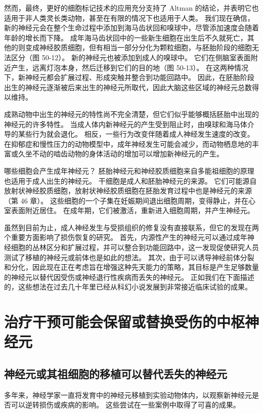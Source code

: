 然而，最终，更好的细胞标记技术的应用充分支持了 Altman 的结论，并表明它也适用于非人类灵长类动物，甚至在有限的情况下也适用于人类。 我们现在确信，新的神经元会在整个生命过程中添加到海马齿状回和嗅球中，尽管添加速度会随着年龄的增长而下降。 成年海马齿状回中的一些新生细胞在出生后不久就死亡，其他的则变成神经胶质细胞，但有相当一部分分化为颗粒细胞，与胚胎阶段的细胞无法区分（图 50-12）。 新的神经元也被添加到成人的嗅球中。 它们在侧脑室表面附近产生，远离灯泡本身，然后迁移到它们的目的地（图 50-13）。 在这两种情况下，新神经元都会扩展过程、形成突触并整合到功能回路中。 因此，在胚胎阶段出生的神经元逐渐被后来出生的神经元所取代，因此大脑这些区域的神经元总数得以维持。

成熟动物中出生的神经元的特性尚不完全清楚，但它们似乎能够概括胚胎中出现的神经元的许多特性。 当成人体内新神经元的产生受到阻止时，由嗅球和海马体介导的某些行为就会退化。 相反，一些行为改变伴随着成人神经发生速度的改变。 在抑郁症和慢性压力的动物模型中，成年神经发生可能会减少，而动物栖息地的丰富或久坐不动的啮齿动物的身体活动的增加可以增加新神经元的产生。

哪些细胞会产生成年神经元？ 胚胎神经元和神经胶质细胞来自多能祖细胞的原理也适用于成人出生的神经元。 干细胞是成人和胚胎神经元的来源。 它们可能源自放射状神经胶质细胞，放射状神经胶质细胞在胚胎发育过程中也是神经元的来源（第 46 章）。 这些细胞的一个子集在妊娠期间退出细胞周期，变得静止，并在心室表面附近居住。 在成年期，它们被激活，重新进入细胞周期，并产生神经元。

虽然到目前为止，成人神经发生与受损组织的修复没有直接联系，但它的发现在两个重要方面影响了损伤恢复的研究。 首先，内源性产生的神经元可以通过成年神经细胞的丛林区分和扩展过程，并可以整合到功能回路中，这一发现促使研究人员测试了移植的神经元或前体也是如此的想法。 其次，由于可以诱导神经前体分裂和分化，因此现在正在考虑旨在增强这种先天能力的策略，其目标是产生足够数量的神经元以替代因受伤或神经退行性疾病而丢失的神经元。 正如我们在下面描述的，这些想法在过去几十年里已经从科幻小说发展到非常接近临床试验的成果。

\section{治疗干预可能会保留或替换受伤的中枢神经元}


\subsection{神经元或其祖细胞的移植可以替代丢失的神经元}
多年来，神经学家一直将发育中的神经元移植到实验动物体内，以观察新神经元是否可以逆转损伤或疾病的影响。 这些尝试在一些案例中取得了可喜的成果。

